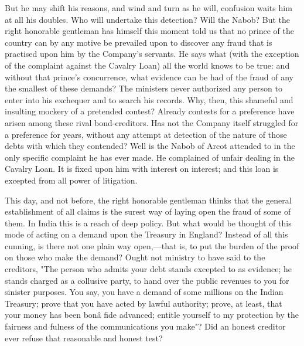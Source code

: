But he may shift his reasons, and wind and turn as he will, confusion waits him at all his doubles. Who will undertake this detection? Will the Nabob? But the right honorable gentleman has himself this moment told us that no prince of the country can by any motive be prevailed upon to discover any fraud that is practised upon him by the Company's servants. He says what (with the exception of the complaint against the Cavalry Loan) all the world knows to be true: and without that prince's concurrence, what evidence can be had of the fraud of any the smallest of these demands? The ministers never authorized any person to enter into his exchequer and to search his records. Why, then, this shameful and insulting mockery of a pretended contest? Already contests for a preference have arisen among these rival bond-creditors. Has not the Company itself struggled for a preference for years, without any attempt at detection of the nature of those debts with which they contended? Well is the Nabob of Arcot attended to in the only specific complaint he has ever made. He complained of unfair dealing in the Cavalry Loan. It is fixed upon him with interest on interest; and this loan is excepted from all power of litigation.

This day, and not before, the right honorable gentleman thinks that the general establishment of all claims is the surest way of laying open the fraud of some of them. In India this is a reach of deep policy. But what would be thought of this mode of acting on a demand upon the Treasury in England? Instead of all this cunning, is there not one plain way open,—that is, to put the burden of the proof on those who make the demand? Ought not ministry to have said to the creditors, "The person who admits your debt stands excepted to as evidence; he stands charged as a collusive party, to hand over the public revenues to you for sinister purposes. You say, you have a demand of some millions on the Indian Treasury; prove that you have acted by lawful authority; prove, at least, that your money has been bonâ fide advanced; entitle yourself to my protection by the fairness and fulness of the communications you make"? Did an honest creditor ever refuse that reasonable and honest test?

